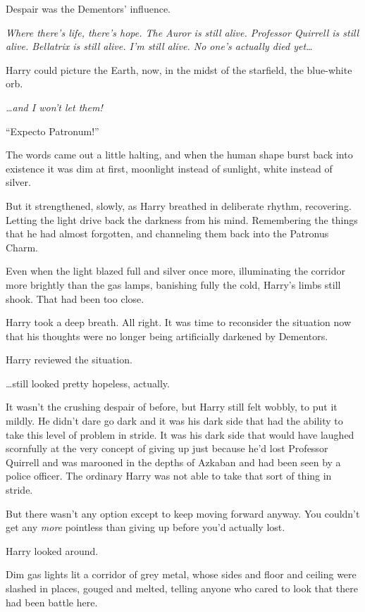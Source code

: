 Despair was the Dementors' influence.

\emph{Where there's life, there's hope. The Auror is still alive.
Professor Quirrell is still alive. Bellatrix is still alive. I'm still
alive. No one's actually died yet\ldots{}}

Harry could picture the Earth, now, in the midst of the starfield, the
blue-white orb.

\emph{\ldots{}and I won't let them!}

``Expecto Patronum!''

The words came out a little halting, and when the human shape burst back
into existence it was dim at first, moonlight instead of sunlight, white
instead of silver.

But it strengthened, slowly, as Harry breathed in deliberate rhythm,
recovering. Letting the light drive back the darkness from his mind.
Remembering the things that he had almost forgotten, and channeling them
back into the Patronus Charm.

Even when the light blazed full and silver once more, illuminating the
corridor more brightly than the gas lamps, banishing fully the cold,
Harry's limbs still shook. That had been too close.

Harry took a deep breath. All right. It was time to reconsider the
situation now that his thoughts were no longer being artificially
darkened by Dementors.

Harry reviewed the situation.

\ldots{}still looked pretty hopeless, actually.

It wasn't the crushing despair of before, but Harry still felt wobbly,
to put it mildly. He didn't dare go dark and it was his dark side that
had the ability to take this level of problem in stride. It was his dark
side that would have laughed scornfully at the very concept of giving up
just because he'd lost Professor Quirrell and was marooned in the depths
of Azkaban and had been seen by a police officer. The ordinary Harry was
not able to take that sort of thing in stride.

But there wasn't any option except to keep moving forward anyway. You
couldn't get any \emph{more} pointless than giving up before you'd
actually lost.

Harry looked around.

Dim gas lights lit a corridor of grey metal, whose sides and floor and
ceiling were slashed in places, gouged and melted, telling anyone who
cared to look that there had been battle here.


